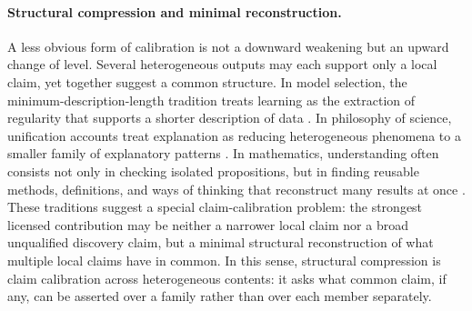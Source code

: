 \documentclass[11pt,a4paper]{article}
\begin{document}
\paragraph{Structural compression and minimal reconstruction.}
A less obvious form of calibration is not a downward weakening but an upward change of level. Several heterogeneous outputs may each support only a local claim, yet together suggest a common structure. In model selection, the minimum-description-length tradition treats learning as the extraction of regularity that supports a shorter description of data \citep{Rissanen1978ShortestDataDescription,GrunwaldRoos2019MDLRevisited}. In philosophy of science, unification accounts treat explanation as reducing heterogeneous phenomena to a smaller family of explanatory patterns \citep{Friedman1974ExplanationUnderstanding,Kitcher1981ExplanatoryUnification}. In mathematics, understanding often consists not only in checking isolated propositions, but in finding reusable methods, definitions, and ways of thinking that reconstruct many results at once \citep{Thurston1994ProofProgress,Avigad2006MathematicalMethodProof}. These traditions suggest a special claim-calibration problem: the strongest licensed contribution may be neither a narrower local claim nor a broad unqualified discovery claim, but a minimal structural reconstruction of what multiple local claims have in common. In this sense, structural compression is claim calibration across heterogeneous contents: it asks what common claim, if any, can be asserted over a family rather than over each member separately.
\end{document}
